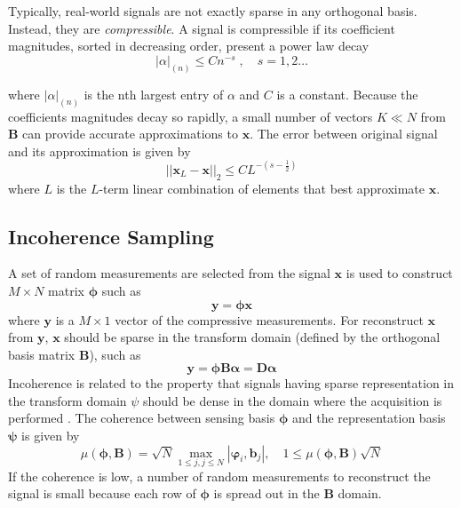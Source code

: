 Typically, real-world signals are not exactly sparse in any orthogonal basis. Instead, they are \emph{compressible}. A signal is compressible if its coefficient magnitudes, sorted in decreasing order, present a power law decay
\begin{equation}
|\alpha|_{(n)} \leq C n^{-s}\;,\quad s=1,2 \ldots
\end{equation}

where $|\alpha|_{(n)}$ is the nth largest entry of $\alpha$ and $C$ is a constant. Because the coefficients magnitudes decay so rapidly, a small number of vectors $K \ll N$ from $\boldsymbol{B}$ can provide accurate
approximations to $\boldsymbol{x}$. The error between original signal and its approximation is given by
\begin{equation}
||\boldsymbol{x}_L - \boldsymbol{x}||_2 \leq CL^{-(s-\frac{1}{2})}
\end{equation}
where $L$ is the $L$-term linear combination of elements that best approximate $\boldsymbol{x}$.  

\subsection{Incoherence Sampling}

A set of random measurements are selected from the signal $\boldsymbol{x}$ is used to construct $M \times N$ matrix $\boldsymbol{\phi}$ such as
\begin{equation}
\boldsymbol{y} = \boldsymbol{\phi x}
\end{equation}
where $\boldsymbol{y}$ is a $M\times 1$ vector of the compressive measurements. For reconstruct $\boldsymbol{x}$ from $\boldsymbol{y}$, $\boldsymbol{x}$ should be sparse in the transform domain (defined by the orthogonal basis matrix $\boldsymbol{B}$), such as
\begin{equation}
\boldsymbol{y}=\boldsymbol{\phi B \alpha}= \boldsymbol{D\alpha}
\end{equation}
Incoherence is related to the property that signals having sparse representation in the transform domain $\psi$ should be dense in the domain where the acquisition is performed \cite{compressive}. The coherence between sensing basis $\boldsymbol{\phi}$ and the representation basis $\boldsymbol{\psi}$ is given by
\begin{equation}
\mu(\boldsymbol{\phi},\boldsymbol{B})= \sqrt{N} \max_{1 \leq j, j \leq N} | \boldsymbol{\varphi}_i,\boldsymbol{b}_j|, \quad 1\leq \mu(\boldsymbol{\phi},\boldsymbol{B}) \sqrt{N}
\end{equation}
If the coherence is low, a number of random measurements to reconstruct the signal is small because each row of $\boldsymbol{\phi}$ is spread out in the $\boldsymbol{B}$ domain.

